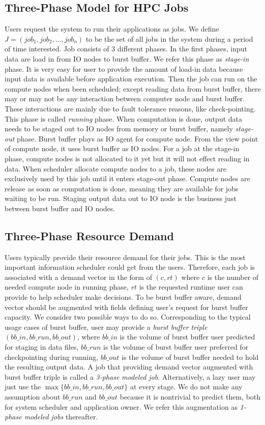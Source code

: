 \subsection{Three-Phase Model for HPC Jobs}
Users request the system to run their applications as jobs.
We define $J = (job_1, job_2,..., job_n)$ to be the set of all jobs in the system during
a period of time interested.
Job consists of 3 different phases.
In the first phases, input data are load in from IO nodes to burst buffer.
We refer this phase as \textit{stage-in} phase.
It is very easy for user to provide the amount of load-in data because input data is available before application execution. 
Then the job can run on the compute nodes when been scheduled;
except reading data from burst buffer, there may or may not be any interaction between computer node and burst buffer.
These interactions are mainly due to fault tolerance reasons, like check-pointing.
This phase is called \textit{running} phase.
When computation is done, output data needs to be staged out to IO nodes from memory or burst buffer, namely \textit{stage-out} phase.
Burst buffer plays as IO agent for compute node.
From the view point of compute node, it uses burst buffer as IO nodes.
For a job at the stage-in phase, compute nodes is not allocated to it yet but it will not effect reading in data.
When scheduler allocate compute nodes to a job, these nodes are exclusively used by this job until it enters stage-out phase.
Compute nodes are release as soon as computation is done, meaning they are available for jobs waiting to be run.
Staging output data out to IO node is the business just between burst buffer and IO nodes.


\subsection{Three-Phase Resource Demand}
Users typically provide their resource demand for their jobs.
This is the most important information scheduler could get from the users.
Therefore, each job is associated with a demand vector in the form of $(c, rt)$
where $c$ is the number of needed compute node in running phase,
$rt$ is the requested runtime user can provide to help scheduler make decisions.
To be burst buffer aware, demand vector should be augmented
with fields defining user's request for burst buffer capacity.
We consider two possible ways to do so.
Corresponding to the typical usage cases of burst buffer,
user may provide a \textit{burst buffer triple} $(bb\_in, bb\_run, bb\_out)$,
where $bb\_in$ is the volume of burst buffer user predicted for staging in data files,
$bb\_run$ is the volume of burst buffer user preferred for checkpointing during running,
$bb\_out$ is the volume of burst buffer needed to hold the resulting output data.
A job that providing demand vector augmented with
burst buffer triple is called a \textit{3-phase modeled job}.
Alternatively, a lazy user may just use the $\max\{bb\_in, bb\_run, bb\_out\}$ at every stage.
We do not make any assumption about $bb\_run$ and $bb\_out$ because it is nontrivial to predict them,
both for system scheduler and application owner.
We refer this augmentation as
\textit{1-phase modeled jobs} thereafter.


